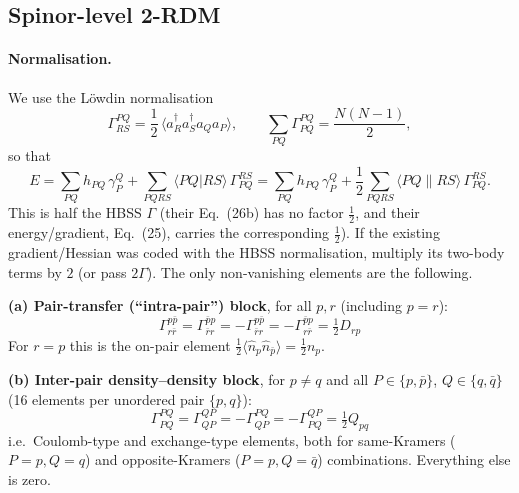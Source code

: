 \documentclass[11pt,a4paper]{article}
\newcommand{\kb}[1]{\bar{#1}}                 %
\newcommand{\asym}[4]{\langle #1 #2 \| #3 #4 \rangle}
\newcommand{\dir}[4]{\langle #1 #2 | #3 #4 \rangle}
\newcommand{\ev}[1]{\langle #1 \rangle}
\begin{document}
\subsection{Spinor-level 2-RDM}

\paragraph{Normalisation.} We use the L\"owdin normalisation
\begin{equation}
  \Gamma^{PQ}_{RS}=\frac12\,\ev{a^\dagger_R a^\dagger_S a_Q a_P},\qquad
  \sum_{PQ}\Gamma^{PQ}_{PQ}=\frac{N(N-1)}{2},
  \label{eq:Gnorm}
\end{equation}
so that
\begin{equation}
  E=\sum_{PQ}h_{PQ}\,\gamma^{Q}_{P}+\sum_{PQRS}\dir PQRS\,\Gamma^{RS}_{PQ}
   =\sum_{PQ}h_{PQ}\,\gamma^{Q}_{P}+\frac12\sum_{PQRS}\asym PQRS\,\Gamma^{RS}_{PQ}.
\end{equation}
This is half the HBSS $\Gamma$ (their Eq.~(26b) has no factor $\tfrac12$, and their energy/gradient,
Eq.~(25), carries the corresponding $\tfrac12$). If the existing gradient/Hessian was coded with the
HBSS normalisation, multiply its two-body terms by $2$ (or pass $2\Gamma$).
The only non-vanishing elements are the following.

\medskip\noindent\textbf{(a) Pair-transfer (``intra-pair'') block}, for all $p,r$ (including $p=r$):
\begin{equation}
  \boxed{\;
  \Gamma^{p\kb p}_{r\kb r}=\Gamma^{\kb p p}_{\kb r r}=-\Gamma^{p\kb p}_{\kb r r}=-\Gamma^{\kb p p}_{r\kb r}=\tfrac12 D_{rp}\;}
\end{equation}
For $r=p$ this is the on-pair element $\tfrac12\ev{\hat n_p\hat n_{\kb p}}=\tfrac12 n_p$.

\medskip\noindent\textbf{(b) Inter-pair density--density block}, for $p\neq q$ and all
$P\in\{p,\kb p\}$, $Q\in\{q,\kb q\}$ (16 elements per unordered pair $\{p,q\}$):
\begin{equation}
  \boxed{\;
  \Gamma^{PQ}_{PQ}=\Gamma^{QP}_{QP}=-\Gamma^{PQ}_{QP}=-\Gamma^{QP}_{PQ}=\tfrac12 Q_{pq}\;}
\end{equation}
i.e.\ Coulomb-type and exchange-type elements, both for same-Kramers ($P=p,Q=q$) and
opposite-Kramers ($P=p,Q=\kb q$) combinations. Everything else is zero.
\end{document}
